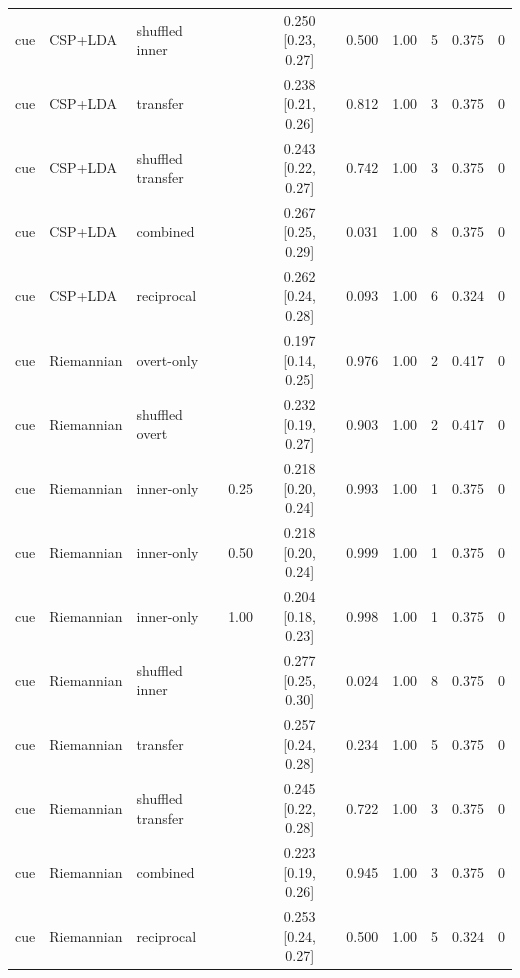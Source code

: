 \begin{longtable}{llllcccccc}
cue & CSP+LDA & shuffled inner &  & 0.250 [0.23, 0.27] & 0.500 & 1.00 & 5 & 0.375 & 0 \\
cue & CSP+LDA & transfer &  & 0.238 [0.21, 0.26] & 0.812 & 1.00 & 3 & 0.375 & 0 \\
cue & CSP+LDA & shuffled transfer &  & 0.243 [0.22, 0.27] & 0.742 & 1.00 & 3 & 0.375 & 0 \\
cue & CSP+LDA & combined &  & 0.267 [0.25, 0.29] & 0.031 & 1.00 & 8 & 0.375 & 0 \\
cue & CSP+LDA & reciprocal &  & 0.262 [0.24, 0.28] & 0.093 & 1.00 & 6 & 0.324 & 0 \\
cue & Riemannian & overt-only &  & 0.197 [0.14, 0.25] & 0.976 & 1.00 & 2 & 0.417 & 0 \\
cue & Riemannian & shuffled overt &  & 0.232 [0.19, 0.27] & 0.903 & 1.00 & 2 & 0.417 & 0 \\
cue & Riemannian & inner-only & 0.25 & 0.218 [0.20, 0.24] & 0.993 & 1.00 & 1 & 0.375 & 0 \\
cue & Riemannian & inner-only & 0.50 & 0.218 [0.20, 0.24] & 0.999 & 1.00 & 1 & 0.375 & 0 \\
cue & Riemannian & inner-only & 1.00 & 0.204 [0.18, 0.23] & 0.998 & 1.00 & 1 & 0.375 & 0 \\
cue & Riemannian & shuffled inner &  & 0.277 [0.25, 0.30] & 0.024 & 1.00 & 8 & 0.375 & 0 \\
cue & Riemannian & transfer &  & 0.257 [0.24, 0.28] & 0.234 & 1.00 & 5 & 0.375 & 0 \\
cue & Riemannian & shuffled transfer &  & 0.245 [0.22, 0.28] & 0.722 & 1.00 & 3 & 0.375 & 0 \\
cue & Riemannian & combined &  & 0.223 [0.19, 0.26] & 0.945 & 1.00 & 3 & 0.375 & 0 \\
cue & Riemannian & reciprocal &  & 0.253 [0.24, 0.27] & 0.500 & 1.00 & 5 & 0.324 & 0 \\
\end{longtable}
